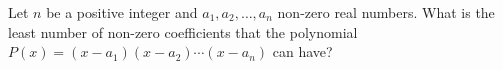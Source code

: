 Let $n$ be a positive integer and $a_1, a_2, \dots, a_n$ non-zero real numbers. What is the least number of non-zero coefficients that the polynomial $P(x) = (x - a_1)(x - a_2)\cdots(x - a_n)$ can have?